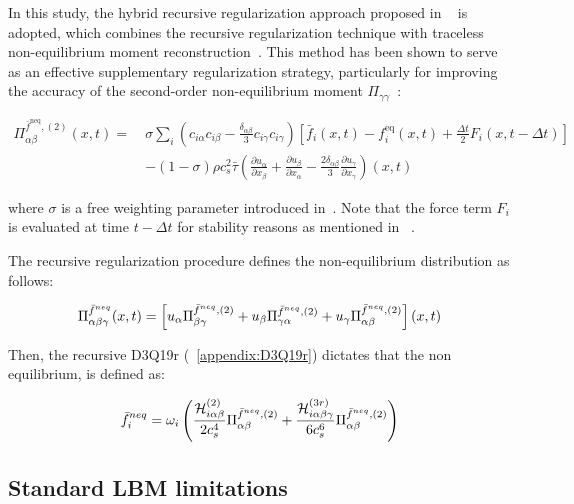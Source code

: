 In this study, the hybrid recursive regularization approach proposed in ~\cite{farag2021unified} is adopted, which combines the recursive regularization technique with traceless non-equilibrium moment reconstruction~\cite{farag2020pressure}. This method has been shown to serve as an effective supplementary regularization strategy, particularly for improving the accuracy of the second-order non-equilibrium moment $\Pi_{\gamma\gamma}$~\cite{wissocq2022hydrodynamic}:

\begin{equation}
\begin{aligned}
\Pi_{\alpha\beta}^{\bar{f}^{\text{neq}},(2)}(x,t) =\ 
&\sigma \sum_i \left( c_{i\alpha} c_{i\beta} - \frac{\delta_{\alpha\beta}}{3} c_{i\gamma} c_{i\gamma} \right) 
\left[ \bar{f}_i(x,t) - f_i^{\text{eq}}(x,t) + \frac{\Delta t}{2} F_i(x,t - \Delta t) \right] \\
&- (1 - \sigma) \rho c_s^2 \bar{\tau} \left( 
\frac{\partial u_\alpha}{\partial x_\beta} + \frac{\partial u_\beta}{\partial x_\alpha} 
- \frac{2 \delta_{\alpha\beta}}{3} \frac{\partial u_\gamma}{\partial x_\gamma} 
\right)(x,t)
\end{aligned}
\end{equation}

where $\sigma$ is a free weighting parameter introduced in~\cite{jacob2018new}. Note that the force term $F_i$ is evaluated at time $t - \Delta t$ for stability reasons as mentioned in ~\cite{farag2021unified}.

The recursive regularization procedure defines the non-equilibrium distribution as follows:

\begin{equation}
    \Pi_{\alpha\beta\gamma}^{\Bar{f}^{neq}}(x,t) = \left[ u_\alpha \Pi_{\beta\gamma}^{\Bar{f}^{neq},(2)} + u_\beta \Pi_{\gamma\alpha}^{\Bar{f}^{neq},(2)} + u_\gamma \Pi_{\alpha\beta}^{\Bar{f}^{neq},(2)}\right](x,t)
\end{equation}

Then, the recursive D3Q19r (~\ref{appendix:D3Q19r}) dictates that the non equilibrium, is defined as:

\begin{equation}
    \Bar{f}^{neq}_i = \omega_i\left( \frac{\mathcal{H}_{i\alpha\beta}^{(2)}}{2c_s^4} \Pi_{\alpha\beta}^{\Bar{f}^{neq},(2)} + \frac{\mathcal{H}_{i\alpha\beta\gamma}^{(3r)}}{6c_s^6} \Pi_{\alpha\beta}^{\Bar{f}^{neq},(2)}\right)
\end{equation}

\subsection{Standard LBM limitations}

